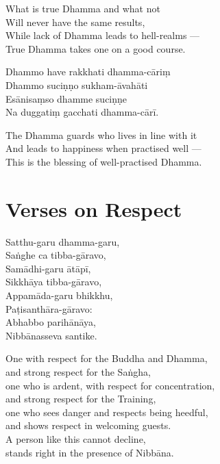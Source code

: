 \begin{english}
  What is true Dhamma and what not\\
  Will never have the same results,\\
  While lack of Dhamma leads to hell-realms ---\\
  True Dhamma takes one on a good course.
\end{english}

\begin{paritta}
  Dhammo have rakkhati dhamma-cāriṃ\\
  Dhammo suciṇṇo sukham-āvahāti\\
  Esānisaṃso dhamme suciṇṇe\\
  Na duggatiṃ gacchati dhamma-cārī.
\end{paritta}

\begin{english}
  The Dhamma guards who lives in line with it\\
  And leads to happiness when practised well ---\\
  This is the blessing of well-practised Dhamma.
\end{english}



\section{Verses on Respect}



Satthu-garu dhamma-garu,\\
Saṅghe ca tibba-gāravo,\\
Samādhi-garu ātāpī,\\
Sikkhāya tibba-gāravo,\\
Appamāda-garu bhikkhu,\\
Paṭisanthāra-gāravo:\\
Abhabbo parihānāya,\\
Nibbānasseva santike.

\begin{english}
  One with respect for the Buddha and Dhamma,\\
  and strong respect for the Saṅgha,\\
  one who is ardent, with respect for concentration,\\
  and strong respect for the Training,\\
  one who sees danger and respects being heedful,\\
  and shows respect in welcoming guests.\\
  A person like this cannot decline,\\
  stands right in the presence of Nibbāna.
\end{english}

